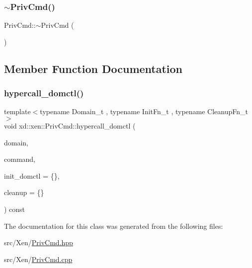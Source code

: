 \subsubsection{\texorpdfstring{$\sim$\+Priv\+Cmd()}{~PrivCmd()}}
{\footnotesize\ttfamily Priv\+Cmd\+::$\sim$\+Priv\+Cmd (\begin{DoxyParamCaption}{ }\end{DoxyParamCaption})}



\subsection{Member Function Documentation}
\mbox{\label{classxd_1_1xen_1_1_priv_cmd_a568c8d4074df8c5144210b6ae9db199f}} 
\subsubsection{\texorpdfstring{hypercall\+\_\+domctl()}{hypercall\_domctl()}}
{\footnotesize\ttfamily template$<$typename Domain\+\_\+t , typename Init\+Fn\+\_\+t , typename Cleanup\+Fn\+\_\+t $>$ \\
void xd\+::xen\+::\+Priv\+Cmd\+::hypercall\+\_\+domctl (\begin{DoxyParamCaption}\item[{Domain\+\_\+t}]{domain,  }\item[{uint32\+\_\+t}]{command,  }\item[{Init\+Fn\+\_\+t}]{init\+\_\+domctl = {\ttfamily \{\}},  }\item[{Cleanup\+Fn\+\_\+t}]{cleanup = {\ttfamily \{\}} }\end{DoxyParamCaption}) const\hspace{0.3cm}{\ttfamily [inline]}}



The documentation for this class was generated from the following files\+:\begin{DoxyCompactItemize}
\item 
src/\+Xen/\mbox{\hyperlink{_priv_cmd_8hpp}{Priv\+Cmd.\+hpp}}\item 
src/\+Xen/\mbox{\hyperlink{_priv_cmd_8cpp}{Priv\+Cmd.\+cpp}}\end{DoxyCompactItemize}

